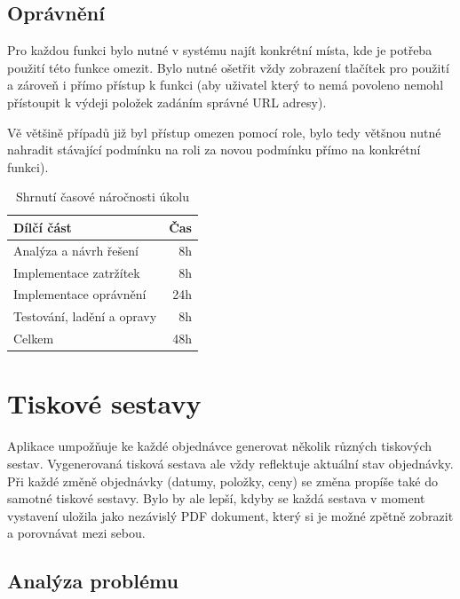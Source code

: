 \subsection{Oprávnění}

Pro každou funkci bylo nutné v systému najít konkrétní místa, kde je potřeba použití této funkce omezit. Bylo nutné ošetřit vždy zobrazení tlačítek pro použití a zároveň i přímo přístup k funkci (aby uživatel který to nemá povoleno nemohl přístoupit k výdeji položek zadáním správné URL adresy).

Vě většině případů již byl přístup omezen pomocí role, bylo tedy většnou nutné nahradit stávající podmínku na roli za novou podmínku přímo na konkrétní funkci).

\begin{table}
	\centering
	\caption[Časová náročnost úkolu na oprávnění]{Shrnutí časové náročnosti úkolu}
	\label{tab:TopLevelTableLabel}
	{
		\begin{tabular}{lr}
			\toprule
			Dílčí část & Čas\\
			\midrule
			Analýza a návrh řešení & 8h \\
			Implementace zatržítek & 8h \\
            Implementace oprávnění & 24h \\
            Testování, ladění a opravy & 8h \\
            \midrule
            Celkem  & 48h \\
			\midrule
		\end{tabular}
	}
\end{table}

\section{Tiskové sestavy}

Aplikace umpožňuje ke každé objednávce generovat několik různých tiskových sestav. Vygenerovaná tisková sestava ale vždy reflektuje aktuální stav objednávky. Při každé změně objednávky (datumy, položky, ceny) se změna propíše také do samotné tiskové sestavy. Bylo by ale lepší, kdyby se každá sestava v moment vystavení uložila jako nezávislý PDF dokument, který si je možné zpětně zobrazit a porovnávat mezi sebou.

\subsection{Analýza problému}

